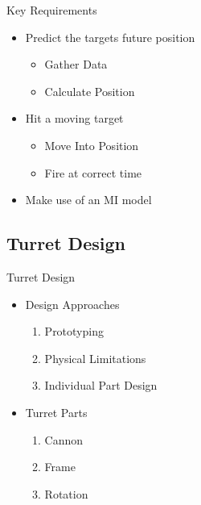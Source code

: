 \begin{frame}{Key Requirements}
\begin{itemize}
	\item Predict the targets future position
		\begin{itemize}
			\item Gather Data
			\item Calculate Position
		\end{itemize}
	\item Hit a moving target
		\begin{itemize}
			\item Move Into Position
			\item Fire at correct time
		\end{itemize}
	\item Make use of an MI model
\end{itemize}
\end{frame}

\subsection{Turret Design}
\begin{frame}{Turret Design}
\begin{itemize}
    \item Design Approaches
		\begin{enumerate}
  			\item Prototyping
  			\item Physical Limitations
  			\item Individual Part Design
		\end{enumerate} 
	\item Turret Parts
		\begin{enumerate}
  			\item Cannon
  			\item Frame
  			\item Rotation
		\end{enumerate}
\end{itemize}
\end{frame}

